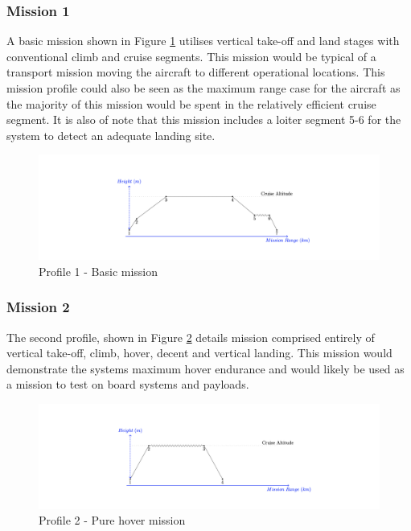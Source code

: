 \subsubsection{Mission 1}
A basic mission shown in Figure \ref{fig:miss1} utilises vertical take-off and land stages with conventional climb and cruise segments. This mission would be typical of a transport mission moving the aircraft to different operational locations. This mission profile could also be seen as the maximum range case for the aircraft as the majority of this mission would be spent in the relatively efficient cruise segment. It is also of note that this mission includes a loiter segment 5-6 for the system to detect an adequate landing site.

\begin{figure}[H]
    \centering
    \includegraphics[width=1\textwidth]{PrelimSizing/mission2.png}
    \caption{Profile 1 - Basic mission}
    \label{fig:miss1}
\end{figure}

\subsubsection{Mission 2}
The second profile, shown in Figure \ref{fig:miss2} details mission comprised entirely of vertical take-off, climb, hover, decent and vertical landing. This mission would demonstrate the systems maximum hover endurance and would likely be used as a mission to test on board systems and payloads. 

\begin{figure}[H]
    \centering
    \includegraphics[width=1\textwidth]{misison5.png}
    \caption{Profile 2 - Pure hover mission}
    \label{fig:miss2}
\end{figure}

